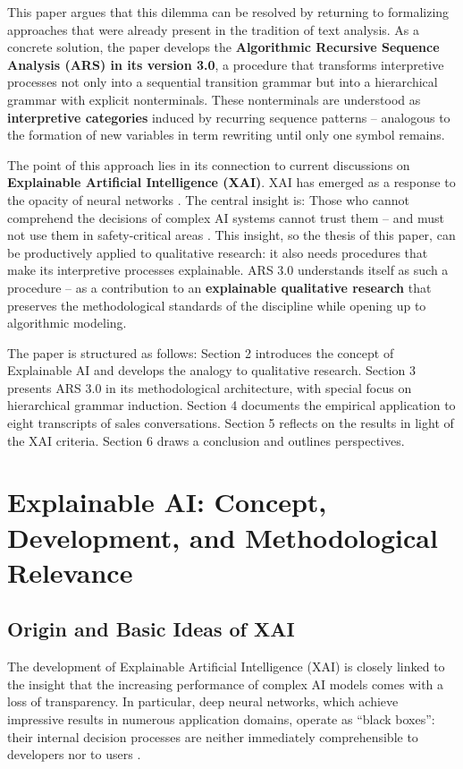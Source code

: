 \documentclass[
  12pt,
  a4paper,
  oneside,
  titlepage
]{article}
\begin{document}
This paper argues that this dilemma can be resolved by returning to 
formalizing approaches that were already present in the tradition of 
text analysis. As a concrete solution, the paper develops the 
\textbf{Algorithmic Recursive Sequence Analysis (ARS) in its version 3.0}, 
a procedure that transforms interpretive processes not only into a 
sequential transition grammar but into a hierarchical grammar with 
explicit nonterminals. These nonterminals are understood as 
\textbf{interpretive categories} induced by recurring sequence patterns 
– analogous to the formation of new variables in term rewriting until 
only one symbol remains.

The point of this approach lies in its connection to current discussions 
on \textbf{Explainable Artificial Intelligence (XAI)}. XAI has emerged 
as a response to the opacity of neural networks \citep{Samek2019, BarredoArrieta2020}. 
The central insight is: Those who cannot comprehend the decisions of 
complex AI systems cannot trust them – and must not use them in 
safety-critical areas \citep{Weller2019}. This insight, so the thesis 
of this paper, can be productively applied to qualitative research: it 
also needs procedures that make its interpretive processes explainable. 
ARS 3.0 understands itself as such a procedure – as a contribution to 
an \textbf{explainable qualitative research} that preserves the 
methodological standards of the discipline while opening up to 
algorithmic modeling.

The paper is structured as follows: Section 2 introduces the concept 
of Explainable AI and develops the analogy to qualitative research. 
Section 3 presents ARS 3.0 in its methodological architecture, with 
special focus on hierarchical grammar induction. Section 4 documents 
the empirical application to eight transcripts of sales conversations. 
Section 5 reflects on the results in light of the XAI criteria. 
Section 6 draws a conclusion and outlines perspectives.

\section{Explainable AI: Concept, Development, and Methodological Relevance}

\subsection{Origin and Basic Ideas of XAI}

The development of Explainable Artificial Intelligence (XAI) is closely 
linked to the insight that the increasing performance of complex AI 
models comes with a loss of transparency. In particular, deep neural 
networks, which achieve impressive results in numerous application 
domains, operate as \enquote{black boxes}: their internal decision 
processes are neither immediately comprehensible to developers nor to 
users \citep[ p.~2]{Samek2019}.
\end{document}
